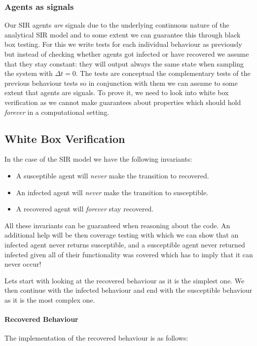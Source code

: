\subsubsection{Agents as signals}
Our SIR agents \textit{are} signals due to the underlying continuous nature of the analytical SIR model and to some extent we can guarantee this through black box testing. For this we write tests for each individual behaviour as previously but instead of checking whether agents got infected or have recovered we assume that they stay constant: they will output always the same state when sampling the system with $\Delta t = 0$. The tests are conceptual the complementary tests of the previous behaviour tests so in conjunction with them we can assume to some extent that agents are signals. To prove it, we need to look into white box verification as we cannot make guarantees about properties which should hold \textit{forever} in a computational setting.

\subsection{White Box Verification}
In the case of the SIR model we have the following invariants: 
\begin{itemize}
	\item A susceptible agent will \textit{never} make the transition to recovered.
	\item An infected agent will \textit{never} make the transition to susceptible.
	\item A recovered agent will \textit{forever} stay recovered.
\end{itemize}

All these invariants can be guaranteed when reasoning about the code. An additional help will be then coverage testing with which we can show that an infected agent never returns susceptible, and a susceptible agent never returned infected given all of their functionality was covered which has to imply that it can never occur!

Lets start with looking at the recovered behaviour as it is the simplest one. We then continue with the infected behaviour and end with the susceptible behaviour as it is the most complex one.

\paragraph{Recovered Behaviour}
The implementation of the recovered behaviour is as follows:

